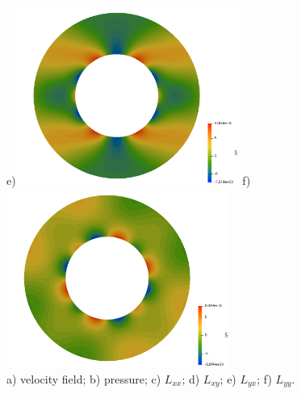 \begin{center}
e)\includegraphics[width=7.3cm]{python_codes/fieldstone_21/results/Lyx}
f)\includegraphics[width=7.3cm]{python_codes/fieldstone_21/results/Lyy}\\
{\captionfont a) velocity field; b) pressure; 
c) $L_{xx}$; 
d) $L_{xy}$; 
e) $L_{yx}$; 
f) $L_{yy}$.}
\end{center}
